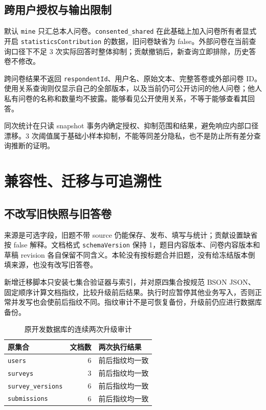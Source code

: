 \documentclass[UTF8,10pt,a4paper,twocolumn,fontset=none]{ctexart}
\begin{document}
\subsection{跨用户授权与输出限制}
默认 \texttt{mine} 只汇总本人问卷。\texttt{consented\_shared} 在此基础上加入问卷所有者显式开启 \texttt{statisticsContribution} 的数据，旧问卷缺省为 false。外部问卷在当前查询口径下不足 3 次实际回答时整体抑制；贡献撤销后，新查询立即排除，历史答卷不修改。

跨问卷结果不返回 \texttt{respondentId}、用户名、原始文本、完整答卷或外部问卷 ID。使用关系查询则仅显示自己的全部版本，以及当前仍可公开访问的他人问卷；他人私有问卷的名称和数量均不披露。能够看见公开使用关系，不等于能够查看其回答。

同次统计在只读 snapshot 事务内确定授权、抑制范围和结果，避免响应内部口径漂移。3 次阈值属于基础小样本抑制，不能等同差分隐私，也不是防止所有差分查询推断的证明。

\section{兼容性、迁移与可追溯性}
\subsection{不改写旧快照与旧答卷}
来源是可选字段，旧题不带 source 仍能保存、发布、填写与统计；贡献设置缺省按 false 解释。文档格式 \texttt{schemaVersion} 保持 1，题目内容版本、问卷内容版本和草稿 revision 各自保留不同含义。本轮没有按标题合并旧题，没有给冻结版本倒填来源，也没有改写旧答卷。

新增迁移脚本只安装七集合验证器与索引，并对原四集合按规范 BSON JSON、固定顺序计算文档指纹，比较升级前后结果。执行时应暂停其他业务写入，否则正常并发写也会使前后指纹不同。指纹审计不是可恢复备份，升级前仍应进行数据库备份。

\begin{table}[t]
\centering\small
\caption{原开发数据库的连续两次升级审计}
\label{tab:migration}
\begin{tabularx}{\columnwidth}{@{}p{30mm}rY@{}}
\toprule 原集合 & 文档数 & 两次执行结果\\\midrule
\texttt{users} & 6 & 前后指纹均一致\\
\texttt{surveys} & 3 & 前后指纹均一致\\
\texttt{survey\_versions} & 6 & 前后指纹均一致\\
\texttt{submissions} & 6 & 前后指纹均一致\\\bottomrule
\end{tabularx}
\end{table}
\end{document}
